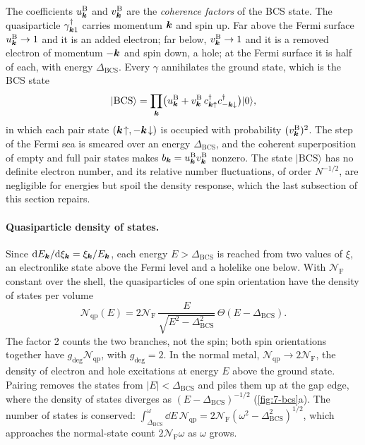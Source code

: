 The coefficients $u^{\mathrm{B}}_{\bm{k}}$ and $v^{\mathrm{B}}_{\bm{k}}$ are the \emph{coherence factors} of the BCS state. The quasiparticle $\gamma^\dagger_{\bm{k}1}$ carries momentum $\bm{k}$ and spin up. Far above the Fermi surface $u^{\mathrm{B}}_{\bm{k}} \to 1$ and it is an added electron; far below, $v^{\mathrm{B}}_{\bm{k}} \to 1$ and it is a removed electron of momentum $-\bm{k}$ and spin down, a hole; at the Fermi surface it is half of each, with energy $\Delta_{\mathrm{BCS}}$. Every $\gamma$ annihilates the ground state, which is the BCS state
\begin{equation}
  |\mathrm{BCS}\rangle = \prod_{\bm{k}}\bigl(u^{\mathrm{B}}_{\bm{k}} + v^{\mathrm{B}}_{\bm{k}}\,c^\dagger_{\bm{k}\uparrow}c^\dagger_{-\bm{k}\downarrow}\bigr)|0\rangle ,
  \label{eq:7.2-BCS}
\end{equation}
in which each pair state $(\bm{k}\!\uparrow, -\bm{k}\!\downarrow)$ is occupied with probability $(v^{\mathrm{B}}_{\bm{k}})^2$. The step of the Fermi sea is smeared over an energy $\Delta_{\mathrm{BCS}}$, and the coherent superposition of empty and full pair states makes $b_{\bm{k}} = u^{\mathrm{B}}_{\bm{k}}v^{\mathrm{B}}_{\bm{k}}$ nonzero. The state $|\mathrm{BCS}\rangle$ has no definite electron number, and its relative number fluctuations, of order $N^{-1/2}$, are negligible for energies but spoil the density response, which the last subsection of this section repairs.

\paragraph{Quasiparticle density of states.} Since $\mathrm{d} E_{\bm{k}}/\mathrm{d}\xi_{\bm{k}} = \xi_{\bm{k}}/E_{\bm{k}}$, each energy $E > \Delta_{\mathrm{BCS}}$ is reached from two values of $\xi$, an electronlike state above the Fermi level and a holelike one below. With $\mathcal{N}_{\mathrm{F}}$ constant over the shell, the quasiparticles of one spin orientation have the density of states per volume
\begin{equation}
  \mathcal{N}_{\mathrm{qp}}(E) = 2\mathcal{N}_{\mathrm{F}}\,\frac{E}{\sqrt{E^2 - \Delta_{\mathrm{BCS}}^2}}\,\Theta(E - \Delta_{\mathrm{BCS}}) .
  \label{eq:7.2-dos}
\end{equation}
The factor 2 counts the two branches, not the spin; both spin orientations together have $g_{\mathrm{deg}}\mathcal{N}_{\mathrm{qp}}$, with $g_{\mathrm{deg}} = 2$. In the normal metal, $\mathcal{N}_{\mathrm{qp}} \to 2\mathcal{N}_{\mathrm{F}}$, the density of electron and hole excitations at energy $E$ above the ground state. Pairing removes the states from $|E| < \Delta_{\mathrm{BCS}}$ and piles them up at the gap edge, where the density of states diverges as $(E - \Delta_{\mathrm{BCS}})^{-1/2}$ (\cref{fig:7-bcs}a). The number of states is conserved: $\int_{\Delta_{\mathrm{BCS}}}^{\omega}\dd E\,\mathcal{N}_{\mathrm{qp}} = 2\mathcal{N}_{\mathrm{F}}(\omega^2 - \Delta_{\mathrm{BCS}}^2)^{1/2}$, which approaches the normal-state count $2\mathcal{N}_{\mathrm{F}}\omega$ as $\omega$ grows.

